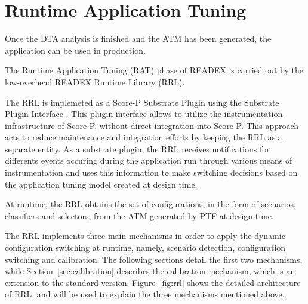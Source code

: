 \section{Runtime Application Tuning} \label{rat}

Once the DTA analysis is finished and the ATM has been generated, the application can be used in production. 

The Runtime Application Tuning (RAT) phase of READEX is carried out by the low-overhead READEX Runtime Library (RRL). 

The RRL is implemeted as a Score-P Substrate Plugin using the Substrate Plugin Interface \cite{Schoene2017}. This plugin interface allows to utilize the instrumentation infrastructure of Score-P, without direct integration into Score-P. This approach acts to reduce maintenance and integration efforts by keeping the RRL as a separate entity. As a substrate plugin, the RRL receives notifications for differents events occuring during the application run through various means of instrumentation and uses this information to make switching decisions based on the application tuning model created at design time.

At runtime, the RRL obtains the set of configurations, in the form of scenarios, classifiers and selectors, from the ATM generated by PTF at design-time.

The RRL implements three main mechanisms in order to apply the dynamic configuration switching at runtime, namely, scenario detection, configuration switching and calibration. The following sections detail the first two mechanisms, while Section~\ref{sec:calibration} describes the calibration mechanism, which is an extension to the standard version. Figure~\ref{fig:rrl} shows the detailed architecture of RRL, and will be used to explain the three mechanisms mentioned above. 


